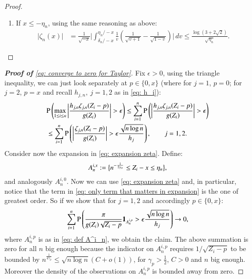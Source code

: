 \begin{proof}
\begin{enumerate}
\begin{align*}
            &= \bigg|  \frac{1}{\sqrt{-x}} \left( \int_{0}^{\delta_n/-x} \frac{1}{v} \left( \frac{1}{\sqrt{v+1}} - \frac{1}{\sqrt{1-v}}\right) \, dv + \int_{\eta_n/-x}^{\infty} \frac{1}{v \sqrt{v+1}} \, dv \right) \bigg|\\
            &\lesssim \frac{\delta_n}{(-x)^{3/2}} + \frac{1}{\sqrt{\eta_n}}
        \end{align*}
        \item If $x \leq-\eta_n$, using the same reasoning as above:
        \begin{align*}
            \big| \zeta_n(x) \big| &= \frac{1}{\sqrt{-x}} \bigg| \int_{\delta_n/-x}^{\eta_n/-x} \frac{1}{v} \left(\frac{1}{\sqrt{v+1}} - \frac{1}{\sqrt{1-v}} \right) \bigg| \, dv \leq \frac{\log{(3+2\sqrt{2})}}{\sqrt{\eta_n}}.
        \end{align*}
    \end{enumerate}
\end{proof}

\begin{proof}[\hypertarget{proof of lemma 6}{\textbf{Proof of}} \eqref{eq: converge to zero for Taylor}]
Fix $\epsilon >0$, using the triangle inequality, we can just look separately at $p \in \{0,x\}$ (where for $j=1$, $p=0$; for $j=2$, $p=x$ and recall $h_{j,n}, \: j = 1,2$ as in \eqref{eq: h_i}):
\begin{align*}
    &\mathrm{P} \left( \max_{1 \leq i \leq n} \bigg|\frac{h_{j,n} \zeta_{j,n} (Z_i - p)}{ g(Z_i)} \bigg| > \epsilon \right) \leq \sum_{i=1}^n \mathrm{P} \left( \bigg|\frac{h_{j,n} \zeta_{j,n} (Z_i - p)}{ g(Z_i)} \bigg| > \epsilon \right) \\
    & \leq \sum_{i=1}^n \mathrm{P} \left( \bigg|\frac{ \zeta_{j,n} (Z_i - p)}{g(Z_i)}  \bigg| > \epsilon \frac{\sqrt{n \log{n}}}{h_{j}}  \right), \quad \quad j=1,2.
\end{align*}
Consider now the expansion in \eqref{eq: expansion zeta}. Define:
\begin{align}\label{eq: def A^i_n}
    A^{i,x}_n := \big\{ n^{-\frac{1}{2\gamma_{\scaleto{x}{2.2pt}}}} \leq Z_i - x \leq \eta_n \big\},
\end{align}
and analogously $A^{i,0}_n$. Now we can use \eqref{eq: expansion zeta} and, in particular, notice that the term in \eqref{eq: only term that matters in expansion} is the one of greatest order. So if we show that for $j=1,2$ and accordingly $p \in \{0,x\}$:
\begin{align*}
    \sum_{i=1}^n \mathrm{P} \left( \frac{ \pi}{g(Z_i) \sqrt{Z_i-p}} \mathbf{1}_{A^{i,p}_n} >  \epsilon \frac{\sqrt{n \log{n}}}{h_{j}}  \right) \rightarrow 0,
\end{align*}
where $A^{i,p}_n$ is as in \eqref{eq: def A^i_n}, we obtain the claim. The above summation is zero for all $n$ big enough because the indicator on $A^{i,p}_n$ requires $1/\sqrt{Z_i -p}$ to be bounded by $n^{\frac{1}{4\gamma_p}} \leq \sqrt{n \log{n}} (C+o(1))$, for $\gamma_p > \frac{1}{2}$, $C>0$ and $n$ big enough. Moreover the density of the observations on $A^{i,p}_n$ is bounded away from zero.    
\end{proof}


